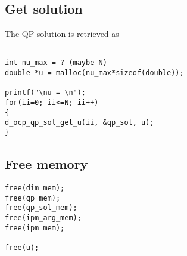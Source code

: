 \documentclass[a4paper]{article}
\begin{document}
\subsection{Get solution}
The QP solution is retrieved as 
\begin{verbatim}

int nu_max = ? (maybe N)
double *u = malloc(nu_max*sizeof(double));

printf("\nu = \n");
for(ii=0; ii<=N; ii++)
{
d_ocp_qp_sol_get_u(ii, &qp_sol, u);
}
\end{verbatim}
\subsection{Free memory}
\begin{verbatim}
free(dim_mem);
free(qp_mem);
free(qp_sol_mem);
free(ipm_arg_mem);
free(ipm_mem);

free(u);

\end{verbatim}
\end{document}
